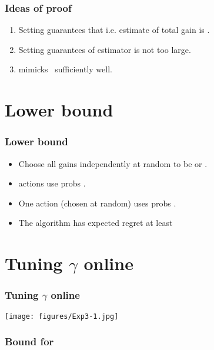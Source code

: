 \documentclass{beamer}
\begin{document}
\begin{frame}
\frametitle{Ideas of proof}
\begin{enumerate}
\item Setting
\R{\[
        \hx{j}{t} = \left\{ \begin{array}{cl}
                \x{j}{t}/\p{j}{t} & \mbox{\rm if $j=\i{t}$}
        \\
                0 & \mbox{\rm otherwise,}
        \end{array} \right.
\]}
guarantees that
i.e. estimate of total gain is .
\item
Setting  guarantees  of estimator is not too large.
\item
\B{$\Aest$} mimicks \B{\hedge}\ sufficiently well.
\end{enumerate}
\end{frame}

\section{Lower bound}

\begin{frame}
\frametitle{Lower bound}
\begin{itemize}
\item Choose all gains independently at random to be  or .
\item {} actions use probs .
\item One action (chosen at random) uses probs .
\item The  algorithm has expected regret at least 
\end{itemize}
\end{frame}

\section{Tuning $\gamma$ online}

\begin{frame}
\frametitle{Tuning $\gamma$ online}
\texttt{[image: figures/Exp3-1.jpg]}
\end{frame}

\begin{frame}
  \frametitle{Bound for }
\end{frame}
\end{document}
